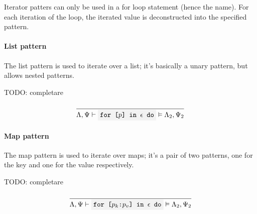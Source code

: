 \documentclass[11pt]{report}
\newcommand{\oprule}[3][gathered]{\frac{\begin{#1}#2\end{#1}}{\begin{gathered}#3\end{gathered}}}
\newcommand{\then}{\vdash}
\newcommand{\Then}{\vDash}
\newcommand{\code}[1]{\texttt{\colorbox{gray!10}{#1}}}
\newcommand{\expr}{\epsilon}
\newcommand{\pattern}{p}
\newcommand{\EnvLoc}{\Lambda}
\newcommand{\EnvStore}{\Psi}
\theoremstyle{definition}
\newcommand{\comment}[1]{
	\parbox{0.9\linewidth}{\color{black!30}\small\sffamily #1}
}
\begin{document}
Iterator patters can only be used in a for loop statement (hence the name). For
each iteration of the loop, the iterated value is deconstructed into the
specified pattern.

\paragraph{List pattern} The list pattern is used to iterate over a list;
it's basically a unary pattern, but allows nested patterns.

\comment{TODO: completare}
\[
	\oprule[aligned]{
	}{
		\EnvLoc,\EnvStore \then \code{for [$\pattern$] in $\expr$ do} \Then \EnvLoc_2,\EnvStore_2\\*
	}
\]


\paragraph{Map pattern} The map pattern is used to iterate over maps; it's a
pair of two patterns, one for the key and one for the value respectively.

\comment{TODO: completare}
\[
	\oprule[aligned]{
	}{
		\EnvLoc,\EnvStore \then \code{for [$\pattern_k$:$\pattern_v$] in $\expr$ do} \Then \EnvLoc_2,\EnvStore_2\\*
	}
\]



\newpage
\end{document}
